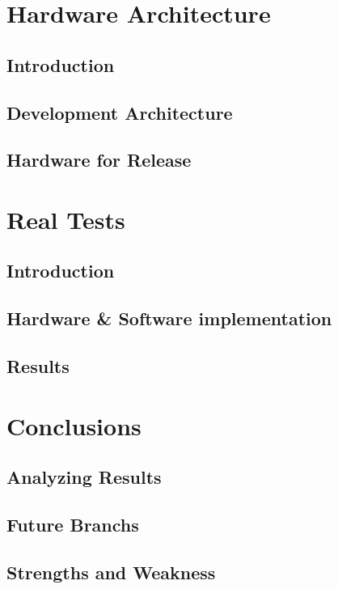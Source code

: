 \documentclass{book} %
\begin{document}
\chapter{Hardware Architecture}
\section{Introduction}
\section{Development Architecture}
\section{Hardware for Release}

\chapter{Real Tests}
\section{Introduction}
\section{Hardware \& Software implementation}
\section{Results}

\chapter{Conclusions} \label{chap:c6_conclusions}
\section{Analyzing Results}
\section{Future Branchs}
\section{Strengths and Weakness}
\end{document}
